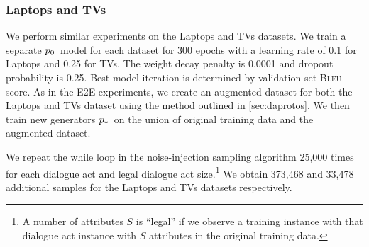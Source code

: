 
\subsubsection{Laptops and TVs}
We perform similar experiments on the Laptops and TVs datasets. 
We train a separate $p_0$~model for each dataset 
for 300 epochs with a learning rate of 0.1
for Laptops and 0.25 for TVs. The weight decay penalty is 0.0001 
and dropout probability is 0.25. Best model iteration is determined
by validation set \textsc{Bleu} score. As in the E2E experiments, we create an
augmented dataset for both the Laptops and TVs dataset using the method
outlined in \autoref{sec:daprotos}. We then train new generators 
$p_*$~on the union of original training data and the augmented dataset.

We repeat the while loop in the noise-injection sampling algorithm 
 25,000 times for each dialogue act and legal dialogue act size.\footnote{A number of attributes $S$ is ``legal'' if we observe a training instance with that dialogue act instance with $S$  attributes in the original training data.}
We obtain 373,468 and 33,478 additional samples for the Laptops 
and TVs datasets respectively.


%
%

